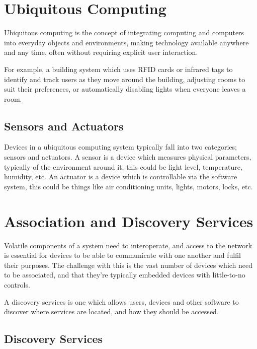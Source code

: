
\section*{Ubiquitous Computing}

Ubiquitous computing is the concept of integrating computing and computers into everyday objects and environments, making technology available anywhere and any time, often without requiring explicit user interaction.

For example, a building system which uses RFID cards or infrared tags to identify and track users as they move around the building, adjusting rooms to suit their preferences, or automatically disabling lights when everyone leaves a room.

\subsection*{Sensors and Actuators}

Devices in a ubiquitous computing system typically fall into two categories; sensors and actuators. A sensor is a device which measures physical parameters, typically of the environment around it, this could be light level, temperature, humidity, etc. An actuator is a device which is controllable via the software system, this could be things like air conditioning units, lights, motors, locks, etc.

\section*{Association and Discovery Services}

Volatile components of a system need to interoperate, and access to the network is essential for devices to be able to communicate with one another and fulfil their purposes. The challenge with this is the vast number of devices which need to be associated, and that they're typically embedded devices with little-to-no controls.

A discovery services is one which allows users, devices and other software to discover where services are located, and how they should be accessed.

\subsection*{Discovery Services}


